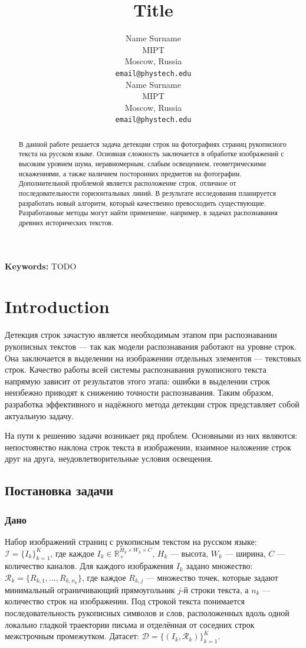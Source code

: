 \documentclass{article}
\title{Title}
\author{
  Name Surname\\
  MIPT\\
  Moscow, Russia\\
  \texttt{email@phystech.edu}\\
  \And
  Name Surname\\
  MIPT\\
  Moscow, Russia\\
  \texttt{email@phystech.edu}\\
}
\begin{document}
\maketitle

\begin{abstract}
    В данной работе решается задача детекции строк на фотографиях страниц рукописного текста на русском языке. Основная сложность заключается в обработке изображений с высоким уровнем шума, неравномерным, слабым освещением, геометрическими искажениями, а также наличием посторонних предметов на фотографии. Дополнительной проблемой является расположение строк, отличное от последовательности горизонтальных линий. В результате исследования планируется разработать новый алгоритм, который качественно превосходить существующие. Разработанные методы могут найти применение, например, в задачах распознавания древних исторических текстов.
\end{abstract}

\textbf{Keywords:} TODO

\section{Introduction}\label{sec:intro}

Детекция строк зачастую является необходимым этапом при распознавании рукописных текстов — так как модели распознавания работают на уровне строк. Она заключается в выделении на изображении отдельных элементов — текстовых строк. Качество работы всей системы распознавания рукописного текста напрямую зависит от результатов этого этапа: ошибки в выделении строк неизбежно приводят к снижению точности распознавания. Таким образом, разработка эффективного и надёжного метода детекции строк представляет собой актуальную задачу.

На пути к решению задачи возникает ряд проблем. Основными из них являются: непостоянство наклона строк текста в изображении, взаимное наложение строк друг на друга, неудовлетворительные условия освещения.

\subsection{Постановка задачи}
\subsubsection{Дано}
 Набор изображений страниц с рукописным текстом на русском языке: $\mathcal{I} = \{I_k\}_{k=1}^K$, где каждое $I_k \in \mathbb{R}_+^{H_k \times W_k \times C}$, $H_k$ — высота, $W_k$ — ширина, $C$ — количество каналов.
Для каждого изображения $I_k$ задано множество: $\mathcal{R}_k = \{R_{k,1}, \dots, R_{k, n_k}\}$, 
    где каждое $R_{k,j}$ — множество точек, которые задают минимальный ограничивающий прямоугольник $j$-й строки текста, а $n_k$ — количество строк на изображении. Под строкой текста понимается последовательность рукописных символов и слов, расположенных вдоль одной локально гладкой
    траектории письма и отделённая от соседних строк межстрочным промежутком.
Датасет: $\mathcal{D} = \{(I_k, \mathcal{R}_k)\}_{k=1}^K$.
\end{document}

